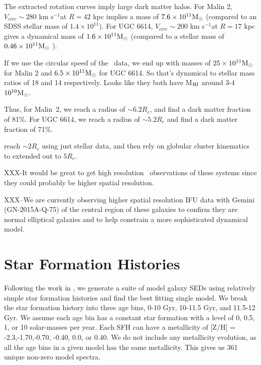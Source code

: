 \documentclass[12pt,preprint]{aastex}
\newcommand\msun{\rm{M}_\odot}
\newcommand\kms{km s$^{-1}$}
\newcommand\HI{\ion{H}{1}}
\begin{document}
The extracted rotation curves imply large dark matter halos.  For Malin 2, $V_{circ}\sim 280$ \kms at $R=42$ kpc implies a mass of $7.6\times 10^{11} \msun$ (compared to an SDSS stellar mass of $1.4\times 10^{11}$).  For UGC 6614, $V_{circ}\sim 200$ \kms at $R=17$ kpc gives a dynamical mass of $1.6\times 10^{11} \msun$ (compared to a stellar mass of$0.46\times 10^{11} \msun$ ).  

If we use the circular speed of the \HI\ data, we end up with masses of $25\times 10^{11} \msun$ for Malin 2 and $6.5\times 10^{11} \msun$ for UGC 6614.  So that's dynamical to stellar mass ratios of 18 and 14 respectively.  Looks like they both have M$_{\rm{HI}}$ around 3-4 $10^{10} \msun$.  

Thus, for Malin~2, we reach a radius of $\sim 6.2 R_e$, and find a dark matter fraction of 81\%.  For UGC 6614, we reach a radius of  $\sim 5.2 R_e$ and find a dark matter fraction of 71\%.  

\citet{Murphy2011} reach $\sim2 R_e$ using just stellar data, and then rely on globular cluster kinematics to extended out to $5 R_e$.





XXX-It would be great to get high resolution \HI\ observations of these systems since they could probably be higher spatial resolution.

XXX--We are currently observing higher spatial resolution IFU data with Gemini (GN-2015A-Q-75) of the central region of these galaxies to confirm they are normal elliptical galaxies and to help constrain a more sophisticated dynamical model.

\section{Star Formation Histories}

Following the work in \citet{Yoachim10,Yoachim12}, we generate a suite of model galaxy SEDs using relatively simple star formation histories and find the best fitting single model.  We break the star formation history into three age bins, 0-10 Gyr, 10-11.5 Gyr, and 11.5-12 Gyr.  We assume each age bin has a constant star formation with a level of 0, 0.5, 1, or 10 solar-masses per year.  Each SFH can have a metallicity of [Z/H] = -2.3,-1.70,-0.70, -0.40, 0.0, or  0.40.  We do not include any metallicity evolution, as all the age bins in a given model has the same metallicity.  This gives us 361 unique non-zero model spectra.  
  
\end{document}

